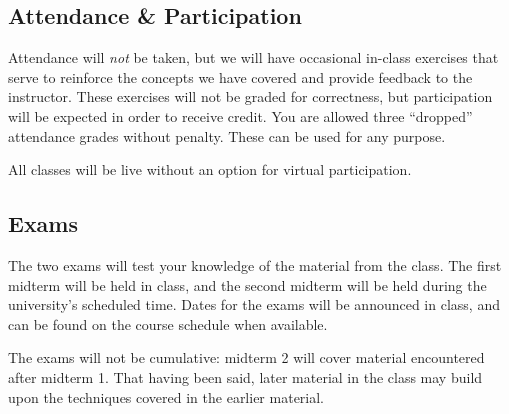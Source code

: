 \documentclass[12pt]{scrartcl}
\begin{document}
\subsection{Attendance \& Participation}
Attendance will \emph{not} be taken, 
but we will have occasional in-class exercises that serve to reinforce the concepts we have covered and provide feedback to the instructor. 
These exercises will not be graded for correctness, but participation will be expected in order to receive credit.
You are allowed three ``dropped'' attendance grades without penalty. 
These can be used for any purpose. 

All classes will be live without an option for virtual participation.

\subsection{Exams}
The two exams will test your knowledge of the material from the class. 
The first midterm will be held in class, and the second midterm will be held during the university’s scheduled time. 
Dates for the exams will be announced in class, and can be found on the course schedule when available.

The exams will not be cumulative: midterm 2 will cover material encountered after midterm 1. 
That having been said, later material in the class may build upon the techniques covered in the earlier material.







\end{document}
